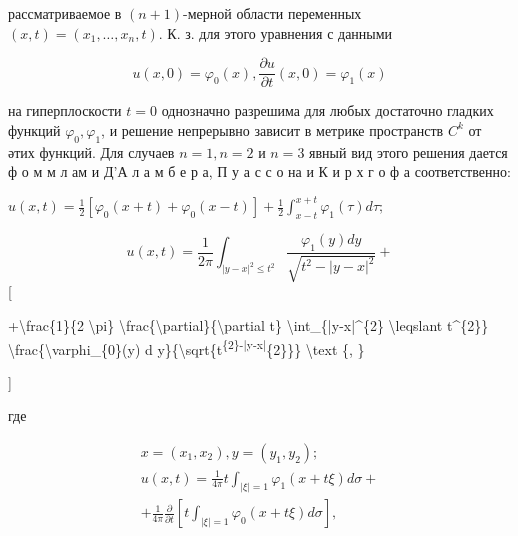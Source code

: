 \documentclass[10pt]{article}
\begin{document}
рассматриваемое в $(n+1)$-мерной области переменных $(x, t)=\left(x_{1}, \ldots, x_{n}, t\right)$. К. з. для этого уравнения с данными



\[

u(x, 0)=\varphi_{0}(x), \frac{\partial u}{\partial t}(x, 0)=\varphi_{1}(x)

\]



на гиперплоскости $t=0$ однозначно разрешима для любых достаточно гладких функций $\varphi_{0}, \varphi_{1}$, и решение непрерывно зависит в метрике пространств $C^{k}$ от әтих функций. Для случаев $n=1, n=2$ и $n=3$ явный вид этого решения дается ф о м м л ам и Д'А л а м б е р а, П у а с с о на и К и р х г о ф а соответственно:



$u(x, t)=\frac{1}{2}\left[\varphi_{0}(x+t)+\varphi_{0}(x-t)\right]+\frac{1}{2} \int_{x-t}^{x+t} \varphi_{1}(\tau) d \tau ;$



\[

u(x, t)=\frac{1}{2 \pi} \int_{|y-x|^{2} \leqslant t^{2}} \frac{\varphi_{1}(y) d y}{\sqrt{t^{2}-|y-x|^{2}}}+

\][



+\textbackslash frac\{1\}\{2 \textbackslash pi\} \textbackslash frac\{\textbackslash partial\}\{\textbackslash partial t\} \textbackslash int\_\{|y-x|\^{}\{2\} \textbackslash leqslant t\^{}\{2\}\} \textbackslash frac\{\textbackslash varphi\_\{0\}(y) d y\}\{\textbackslash sqrt\{t\textsuperscript{\{2\}-|y-x|}\{2\}\}\} \textbackslash text \{, \}

]



где



\[

\begin{gathered}

x=\left(x_{1}, x_{2}\right), y=\left(y_{1}, y_{2}\right) ; \\

u(x, t)=\frac{1}{4 \pi} t \int_{|\xi|=1} \varphi_{1}(x+t \xi) d \sigma+ \\

+\frac{1}{4 \pi} \frac{\partial}{\partial t}\left[t \int_{|\xi|=1} \varphi_{0}(x+t \xi) d \sigma\right],

\end{gathered}

\]
\end{document}
